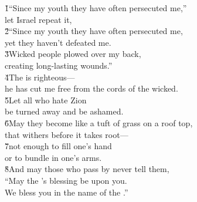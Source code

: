 \begin{poetry}
\poeml \v{1}``Since my youth they have often persecuted me,'' \\
\poemll    let Israel repeat it, \\
\poeml \v{2}``Since my youth they have often persecuted me, \\
\poemll    yet they haven't defeated me. \\
\poeml \v{3}Wicked people plowed over my back, \\
\poemll    creating long-lasting wounds.'' \\
\poeml \v{4}The  is righteous--- \\
\poemll    he has cut me free from the cords of the wicked. \\
\poeml \v{5}Let all who hate Zion \\
\poemll    be turned away and be ashamed. \\
\poeml \v{6}May they become like a tuft of grass on a roof top, \\
\poemll    that withers before it takes root--- \\
\poeml \v{7}not enough to fill one's hand \\
\poemll    or to bundle in one's arms. \\
\poeml \v{8}And may those who pass by never tell them, \\
\poemll    ``May the 's blessing be upon you. \\
\poemlll       We bless you in the name of the .''
\end{poetry}

